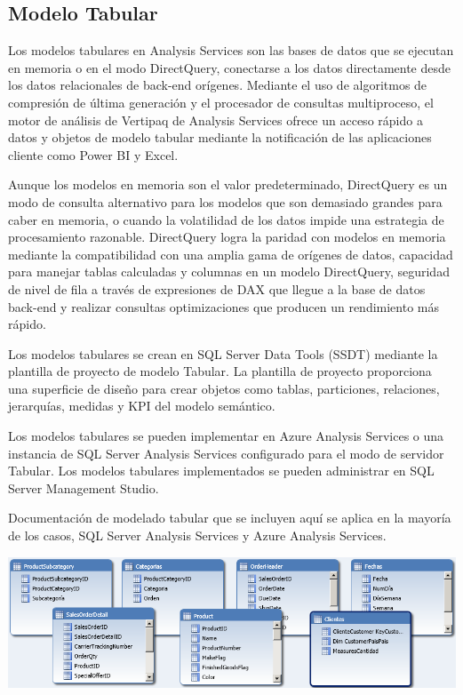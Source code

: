 \subsection{Modelo Tabular}


Los modelos tabulares en Analysis Services son las bases de datos que se ejecutan en memoria o en el modo DirectQuery, conectarse a los datos directamente desde los datos relacionales de back-end orígenes. Mediante el uso de algoritmos de compresión de última generación y el procesador de consultas multiproceso, el motor de análisis de Vertipaq de Analysis Services ofrece un acceso rápido a datos y objetos de modelo tabular mediante la notificación de las aplicaciones cliente como Power BI y Excel. \newline



Aunque los modelos en memoria son el valor predeterminado, DirectQuery es un modo de consulta alternativo para los modelos que son demasiado grandes para caber en memoria, o cuando la volatilidad de los datos impide una estrategia de procesamiento razonable. DirectQuery logra la paridad con modelos en memoria mediante la compatibilidad con una amplia gama de orígenes de datos, capacidad para manejar tablas calculadas y columnas en un modelo DirectQuery, seguridad de nivel de fila a través de expresiones de DAX que llegue a la base de datos back-end y realizar consultas optimizaciones que producen un rendimiento más rápido. \newline


Los modelos tabulares se crean en SQL Server Data Tools (SSDT) mediante la plantilla de proyecto de modelo Tabular. La plantilla de proyecto proporciona una superficie de diseño para crear objetos como tablas, particiones, relaciones, jerarquías, medidas y KPI del modelo semántico. \newline

Los modelos tabulares se pueden implementar en Azure Analysis Services o una instancia de SQL Server Analysis Services configurado para el modo de servidor Tabular. Los modelos tabulares implementados se pueden administrar en SQL Server Management Studio. \newline

Documentación de modelado tabular que se incluyen aquí se aplica en la mayoría de los casos, SQL Server Analysis Services y Azure Analysis Services. \newline


\begin{center}
\includegraphics{images/BS/imagen 05.png}\newline
\end{center}



